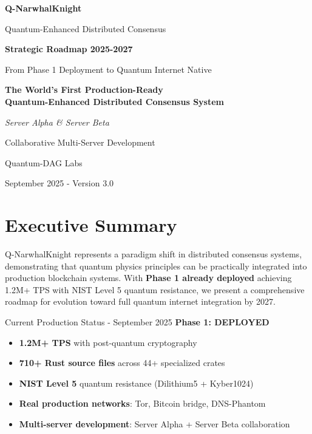 \documentclass[11pt,a4paper]{article}
\begin{document}
\begin{titlepage}
\centering
{\Huge\textbf{\textcolor{quantumblue}{Q-NarwhalKnight}}\par}
\vspace{0.5cm}
{\Large\textcolor{quantumgreen}{Quantum-Enhanced Distributed Consensus}\par}
\vspace{1cm}
{\huge\textbf{Strategic Roadmap 2025-2027}\par}
\vspace{0.5cm}
{\Large From Phase 1 Deployment to Quantum Internet Native\par}
\vspace{2cm}

\begin{tcolorbox}[colback=quantumblue!5!white,colframe=quantumblue!75!black]
\centering
\textbf{The World's First Production-Ready\\Quantum-Enhanced Distributed Consensus System}
\end{tcolorbox}

\vspace{2cm}
{\Large\textit{Server Alpha \& Server Beta}\par}
{\large Collaborative Multi-Server Development\par}
\vspace{1cm}
{\large Quantum-DAG Labs\par}
{\normalsize September 2025 - Version 3.0\par}
\end{titlepage}

\newpage
\tableofcontents
\newpage

\section{Executive Summary}

Q-NarwhalKnight represents a paradigm shift in distributed consensus systems, demonstrating that quantum physics principles can be practically integrated into production blockchain systems. With \textbf{Phase 1 already deployed} achieving 1.2M+ TPS with NIST Level 5 quantum resistance, we present a comprehensive roadmap for evolution toward full quantum internet integration by 2027.

\begin{achievementbox}{Current Production Status - September 2025}
\textbf{Phase 1: DEPLOYED}
\begin{itemize}
\item \textbf{1.2M+ TPS} with post-quantum cryptography 
\item \textbf{710+ Rust source files} across 44+ specialized crates
\item \textbf{NIST Level 5} quantum resistance (Dilithium5 + Kyber1024)
\item \textbf{Real production networks}: Tor, Bitcoin bridge, DNS-Phantom
\item \textbf{Multi-server development}: Server Alpha + Server Beta collaboration
\end{itemize}
\end{achievementbox}
\end{document}
